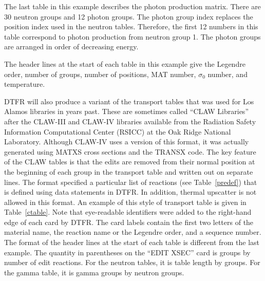 The last table in this example describes the photon production
matrix.  There are 30 neutron groups and 12 photon groups.  The photon
group index replaces the position index used in the neutron tables.
Therefore, the first 12 numbers in this table correspond to photon
production from neutron group 1.  The photon groups are arranged in
order of decreasing energy.

The header lines at the start of each table in this example give
the Legendre order, number of groups, number of positions,
MAT number, $\sigma_0$ number, and temperature.

DTFR will also produce a variant of the transport tables that was used
for Los Alamos libraries in years past.  These are sometimes called
``CLAW Libraries'' after the CLAW-III and CLAW-IV libraries available
from the Radiation Safety Information Computational Center (RSICC)
 at the Oak Ridge National Laboratory.  Although CLAW-IV
uses a version of this format, it was actually generated using MATXS
cross sections and the TRANSX code\cite{CLAW4,TRANSX}.
The key feature of the CLAW tables is that the edits are removed
from their normal position at the beginning of each group in the
transport table and written out on separate lines.  The format
specified a particular list of reactions (see Table~\ref{predef}) that
is defined using data statements in DTFR.  In addition, thermal upscatter
is not allowed in this format.  An example of this style of transport
table is given in Table~\ref{ctable}.  Note that eye-readable identifiers
were added to the right-hand edge of each card by DTFR.  The card labels
contain the first two letters of the material name, the reaction name or
the Legendre order, and a sequence number.  The format of the header
lines at the start of each table is different from the last example.
The quantity in parentheses on the ``EDIT XSEC'' card is groups by
number of edit reactions.  For the neutron tables, it is table length
by groups.  For the gamma table, it is gamma groups by neutron groups.


